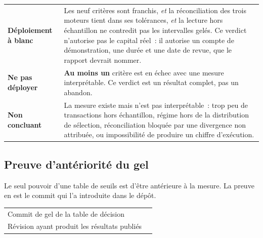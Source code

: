 \begin{center}
\renewcommand{\arraystretch}{1.35}
\begin{tabular}{p{3.6cm} p{10.4cm}}
\toprule
\textbf{Déploiement à blanc} & Les neuf critères sont franchis, \emph{et} la
réconciliation des trois moteurs tient dans ses tolérances, \emph{et} la
lecture hors échantillon ne contredit pas les intervalles gelés. Ce verdict
n'autorise pas le capital réel~: il autorise un compte de démonstration, une
durée et une date de revue, que le rapport devrait nommer. \\
\textbf{Ne pas déployer} & \textbf{Au moins un} critère est en échec avec une
mesure interprétable. Ce verdict est un résultat complet, pas un abandon. \\
\textbf{Non concluant} & La mesure existe mais n'est pas interprétable~: trop
peu de transactions hors échantillon, régime hors de la distribution de
sélection, réconciliation bloquée par une divergence non attribuée, ou
impossibilité de produire un chiffre d'exécution. \\
\bottomrule
\end{tabular}
\end{center}


\subsection{Preuve d'antériorité du gel}

Le seul pouvoir d'une table de seuils est d'être antérieure à la mesure. La
preuve en est le commit qui l'a introduite dans le dépôt.

\begin{center}
\renewcommand{\arraystretch}{1.4}
\begin{tabular}{p{6.4cm} l}
\toprule
Commit de gel de la table de décision & \code{\XTenFreezeCommit} \\
Révision ayant produit les résultats publiés & \code{\XTenGitHead} \\
\bottomrule
\end{tabular}
\end{center}

